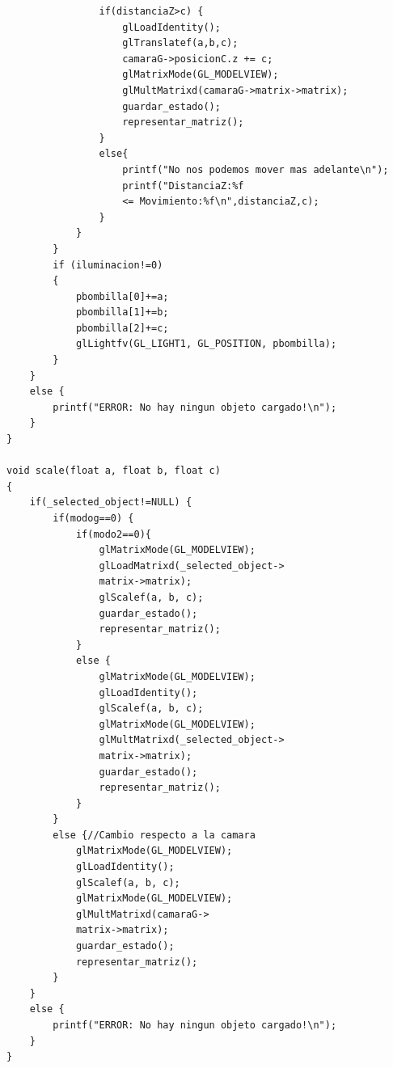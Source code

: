 \documentclass[12pt,a4paper]{article}
\begin{document}
\begin{enumerate}
\begin{lstlisting}
	        	if(distanciaZ>c) {
	        		glLoadIdentity();
		            glTranslatef(a,b,c);
		            camaraG->posicionC.z += c;
		            glMatrixMode(GL_MODELVIEW);
		            glMultMatrixd(camaraG->matrix->matrix);
		            guardar_estado();
		            representar_matriz();
	        	}
	        	else{
	        		printf("No nos podemos mover mas adelante\n");
	        		printf("DistanciaZ:%f 
	        		<= Movimiento:%f\n",distanciaZ,c);
	        	}
	        }
        }
        if (iluminacion!=0)
        {
        	pbombilla[0]+=a;
        	pbombilla[1]+=b;
        	pbombilla[2]+=c;
        	glLightfv(GL_LIGHT1, GL_POSITION, pbombilla);
        }
    }
    else {
        printf("ERROR: No hay ningun objeto cargado!\n");
    }      
}

void scale(float a, float b, float c)
{
    if(_selected_object!=NULL) {
        if(modog==0) {
            if(modo2==0){
                glMatrixMode(GL_MODELVIEW);
                glLoadMatrixd(_selected_object->
                matrix->matrix);
                glScalef(a, b, c);
                guardar_estado();
                representar_matriz();
            }
            else {
                glMatrixMode(GL_MODELVIEW);
                glLoadIdentity();
                glScalef(a, b, c);
                glMatrixMode(GL_MODELVIEW);
                glMultMatrixd(_selected_object->
                matrix->matrix);
                guardar_estado();
                representar_matriz();
            }
        }
        else {//Cambio respecto a la camara
            glMatrixMode(GL_MODELVIEW);
            glLoadIdentity();
            glScalef(a, b, c);
            glMatrixMode(GL_MODELVIEW);
            glMultMatrixd(camaraG->
            matrix->matrix);
            guardar_estado();
            representar_matriz();
        }
    }
    else {
        printf("ERROR: No hay ningun objeto cargado!\n");
    }
}



\end{lstlisting}
\end{enumerate}
\end{document}
